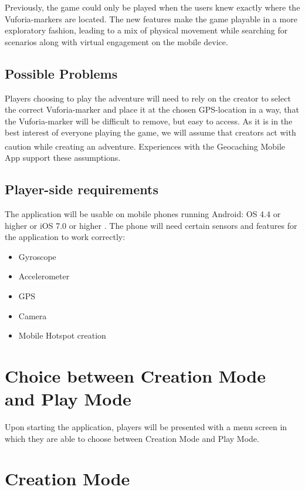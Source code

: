 \documentclass{sigchi-ext}
\begin{document}
Previously, the game could only be played when the users knew exactly where the Vuforia-markers are located. The new features make the game playable in a more exploratory fashion, leading to a mix of physical movement while searching for scenarios along with virtual engagement on the mobile device. 

\subsection{Possible Problems}

Players choosing to play the adventure will need to rely on the creator to select the correct Vuforia-marker and place it at the chosen GPS-location in a way, that the Vuforia-marker will be difficult to remove, but easy to access. As it is in the best interest of everyone playing the game, we will assume that creators act with caution while creating an adventure. Experiences with the Geocaching\textsuperscript{\textregistered} Mobile App \cite{app:geocaching} support these assumptions.

\subsection{Player-side requirements}

The application will be usable on mobile phones running Android: OS 4.4 or higher or iOS 7.0 or higher \cite{unityRequirements}. The phone will need certain sensors and features for the application to work correctly:

\begin{itemize}\compresslist%
	\item Gyroscope
	\item Accelerometer
	\item GPS
	\item Camera
	\item Mobile Hotspot creation \cite{desc:hotspot}
\end{itemize}

\section{Choice between Creation Mode and Play Mode}

Upon starting the application, players will be presented with a menu screen in which they are able to choose between Creation Mode and Play Mode.


\section{Creation Mode} 
\label{sec:Creation}
\end{document}
